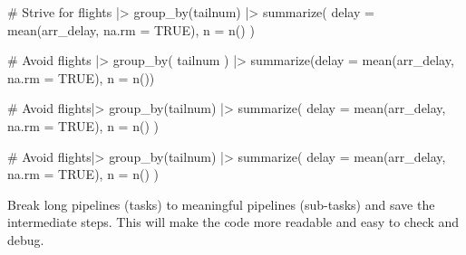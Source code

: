 \documentclass[
  letterpaper,
  DIV=11,
  numbers=noendperiod]{scrreprt}
\newenvironment{Shaded}{\begin{snugshade}}{\end{snugshade}}
\newcommand{\AttributeTok}[1]{\textcolor[rgb]{0.40,0.45,0.13}{#1}}
\newcommand{\CommentTok}[1]{\textcolor[rgb]{0.37,0.37,0.37}{#1}}
\newcommand{\ConstantTok}[1]{\textcolor[rgb]{0.56,0.35,0.01}{#1}}
\newcommand{\FunctionTok}[1]{\textcolor[rgb]{0.28,0.35,0.67}{#1}}
\newcommand{\NormalTok}[1]{\textcolor[rgb]{0.00,0.23,0.31}{#1}}
\newcommand{\SpecialCharTok}[1]{\textcolor[rgb]{0.37,0.37,0.37}{#1}}
\begin{document}
\begin{Shaded}
\begin{Highlighting}[]
\CommentTok{\# Strive for}
\NormalTok{flights }\SpecialCharTok{|\textgreater{}}  
  \FunctionTok{group\_by}\NormalTok{(tailnum) }\SpecialCharTok{|\textgreater{}} 
  \FunctionTok{summarize}\NormalTok{(}
    \AttributeTok{delay =} \FunctionTok{mean}\NormalTok{(arr\_delay, }\AttributeTok{na.rm =} \ConstantTok{TRUE}\NormalTok{),}
    \AttributeTok{n =} \FunctionTok{n}\NormalTok{()}
\NormalTok{  )}

\CommentTok{\# Avoid}
\NormalTok{flights }\SpecialCharTok{|\textgreater{}}
  \FunctionTok{group\_by}\NormalTok{(}
\NormalTok{    tailnum}
\NormalTok{  ) }\SpecialCharTok{|\textgreater{}} 
  \FunctionTok{summarize}\NormalTok{(}\AttributeTok{delay =} \FunctionTok{mean}\NormalTok{(arr\_delay, }\AttributeTok{na.rm =} \ConstantTok{TRUE}\NormalTok{), }\AttributeTok{n =} \FunctionTok{n}\NormalTok{())}

\CommentTok{\# Avoid}
\NormalTok{flights}\SpecialCharTok{|\textgreater{}}
  \FunctionTok{group\_by}\NormalTok{(tailnum) }\SpecialCharTok{|\textgreater{}} 
  \FunctionTok{summarize}\NormalTok{(}
             \AttributeTok{delay =} \FunctionTok{mean}\NormalTok{(arr\_delay, }\AttributeTok{na.rm =} \ConstantTok{TRUE}\NormalTok{), }
             \AttributeTok{n =} \FunctionTok{n}\NormalTok{()}
\NormalTok{           )}

\CommentTok{\# Avoid}
\NormalTok{flights}\SpecialCharTok{|\textgreater{}}
  \FunctionTok{group\_by}\NormalTok{(tailnum) }\SpecialCharTok{|\textgreater{}} 
  \FunctionTok{summarize}\NormalTok{(}
  \AttributeTok{delay =} \FunctionTok{mean}\NormalTok{(arr\_delay, }\AttributeTok{na.rm =} \ConstantTok{TRUE}\NormalTok{), }
  \AttributeTok{n =} \FunctionTok{n}\NormalTok{()}
\NormalTok{  )}
\end{Highlighting}
\end{Shaded}

\begin{tcolorbox}[enhanced jigsaw, breakable, toprule=.15mm, titlerule=0mm, coltitle=black, colback=white, arc=.35mm, opacityback=0, left=2mm, colbacktitle=quarto-callout-note-color!10!white, toptitle=1mm, leftrule=.75mm, title=\textcolor{quarto-callout-note-color}{\faInfo}\hspace{0.5em}{Long Pipeline}, bottomrule=.15mm, bottomtitle=1mm, rightrule=.15mm, opacitybacktitle=0.6, colframe=quarto-callout-note-color-frame]

Break long pipelines (tasks) to meaningful pipelines (sub-tasks) and
save the intermediate steps. This will make the code more readable and
easy to check and debug.

\end{tcolorbox}
\end{document}
